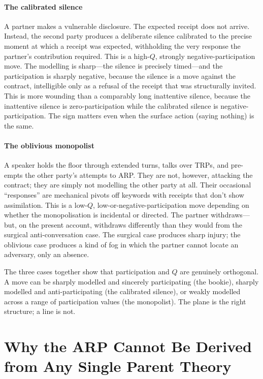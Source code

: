 \paragraph{The calibrated silence} A partner makes a vulnerable disclosure. The expected receipt does not arrive. Instead, the second party produces a deliberate silence calibrated to the precise moment at which a receipt was expected, withholding the very response the partner's contribution required. This is a high-$Q$, strongly negative-participation move. The modelling is sharp---the silence is precisely timed---and the participation is sharply negative, because the silence is a move against the contract, intelligible only as a refusal of the receipt that was structurally invited. This is more wounding than a comparably long inattentive silence, because the inattentive silence is zero-participation while the calibrated silence is negative-participation. The sign matters even when the surface action (saying nothing) is the same.

\paragraph{The oblivious monopolist} A speaker holds the floor through extended turns, talks over TRPs, and pre-empts the other party's attempts to ARP. They are not, however, attacking the contract; they are simply not modelling the other party at all. Their occasional ``responses'' are mechanical pivots off keywords with receipts that don't show assimilation. This is a low-$Q$, low-or-negative-participation move depending on whether the monopolisation is incidental or directed. The partner withdraws---but, on the present account, withdraws differently than they would from the surgical anti-conversation case. The surgical case produces sharp injury; the oblivious case produces a kind of fog in which the partner cannot locate an adversary, only an absence.

The three cases together show that participation and $Q$ are genuinely orthogonal. A move can be sharply modelled and sincerely participating (the bookie), sharply modelled and anti-participating (the calibrated silence), or weakly modelled across a range of participation values (the monopolist). The plane is the right structure; a line is not.

\section{Why the ARP Cannot Be Derived from Any Single Parent Theory}\label{sec:against}

